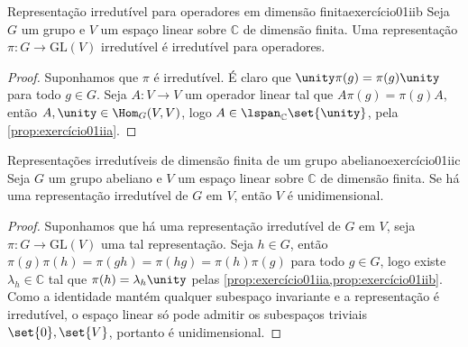 \begin{proposition}{Representação irredutível para operadores em dimensão finita}{exercício01iib}
    Seja \(G\) um grupo e \(V\) um espaço linear sobre \(\mathbb{C}\) de dimensão finita. Uma representação \(\pi : G \to \mathrm{GL}(V)\) irredutível é irredutível para operadores.
\end{proposition}
\begin{proof}
    Suponhamos que \(\pi\) é irredutível. É claro que \(\unity \pi(g) = \pi(g) \unity\) para todo \(g \in G\). Seja \(A: V \to V\) um operador linear tal que \(A \pi(g) = \pi(g) A\), então \(A, \unity \in \Hom_G(V,V)\), logo \(A \in \lspan_{\mathbb{C}}\set{\unity}\), pela \cref{prop:exercício01iia}.
\end{proof}

\begin{proposition}{Representações irredutíveis de dimensão finita de um grupo abeliano}{exercício01iic}
    Seja \(G\) um grupo abeliano e \(V\) um espaço linear sobre \(\mathbb{C}\) de dimensão finita. Se há uma representação irredutível de \(G\) em \(V\), então \(V\) é unidimensional.
\end{proposition}
\begin{proof}
    Suponhamos que há uma representação irredutível de \(G\) em \(V\), seja \(\pi : G \to \mathrm{GL}(V)\) uma tal representação. Seja \(h \in G\), então \(\pi(g)\pi(h) = \pi(gh) = \pi(hg) = \pi(h)\pi(g)\) para todo \(g \in G\), logo existe \(\lambda_h \in \mathbb{C}\) tal que \(\pi(h) = \lambda_h \unity\) pelas \cref{prop:exercício01iia,prop:exercício01iib}. Como a identidade mantém qualquer subespaço invariante e a representação é irredutível, o espaço linear só pode admitir os subespaços triviais \(\set{0}, \set{V}\), portanto é unidimensional.
\end{proof}
